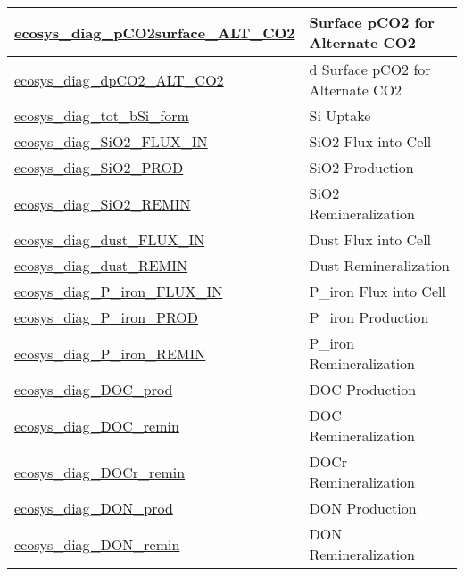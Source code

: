 {\begin{center}
\begin{longtable}{| p{2.0in} | p{4.0in} |}
    \hline
    \hyperref[subsec:var_sec_forcing_ecosys_diag_pCO2surface_ALT_CO2]{ecosys\_diag\_pCO2surface\_\-ALT\_CO2} & Surface pCO2 for Alternate CO2 \\
    \hline
    \hyperref[subsec:var_sec_forcing_ecosys_diag_dpCO2_ALT_CO2]{ecosys\_diag\_dpCO2\_ALT\_CO2} & d Surface pCO2 for Alternate CO2 \\
    \hline
    \hyperref[subsec:var_sec_forcing_ecosys_diag_tot_bSi_form]{ecosys\_diag\_tot\_bSi\_form} & Si Uptake \\
    \hline
    \hyperref[subsec:var_sec_forcing_ecosys_diag_SiO2_FLUX_IN]{ecosys\_diag\_SiO2\_FLUX\_IN} & SiO2 Flux into Cell \\
    \hline
    \hyperref[subsec:var_sec_forcing_ecosys_diag_SiO2_PROD]{ecosys\_diag\_SiO2\_PROD} & SiO2 Production \\
    \hline
    \hyperref[subsec:var_sec_forcing_ecosys_diag_SiO2_REMIN]{ecosys\_diag\_SiO2\_REMIN} & SiO2 Remineralization \\
    \hline
    \hyperref[subsec:var_sec_forcing_ecosys_diag_dust_FLUX_IN]{ecosys\_diag\_dust\_FLUX\_IN} & Dust Flux into Cell \\
    \hline
    \hyperref[subsec:var_sec_forcing_ecosys_diag_dust_REMIN]{ecosys\_diag\_dust\_REMIN} & Dust Remineralization \\
    \hline
    \hyperref[subsec:var_sec_forcing_ecosys_diag_P_iron_FLUX_IN]{ecosys\_diag\_P\_iron\_FLUX\_\-IN} & P\_iron Flux into Cell \\
    \hline
    \hyperref[subsec:var_sec_forcing_ecosys_diag_P_iron_PROD]{ecosys\_diag\_P\_iron\_PROD} & P\_iron Production \\
    \hline
    \hyperref[subsec:var_sec_forcing_ecosys_diag_P_iron_REMIN]{ecosys\_diag\_P\_iron\_REMIN} & P\_iron Remineralization \\
    \hline
    \hyperref[subsec:var_sec_forcing_ecosys_diag_DOC_prod]{ecosys\_diag\_DOC\_prod} & DOC Production \\
    \hline
    \hyperref[subsec:var_sec_forcing_ecosys_diag_DOC_remin]{ecosys\_diag\_DOC\_remin} & DOC Remineralization \\
    \hline
    \hyperref[subsec:var_sec_forcing_ecosys_diag_DOCr_remin]{ecosys\_diag\_DOCr\_remin} & DOCr Remineralization \\
    \hline
    \hyperref[subsec:var_sec_forcing_ecosys_diag_DON_prod]{ecosys\_diag\_DON\_prod} & DON Production \\
    \hline
    \hyperref[subsec:var_sec_forcing_ecosys_diag_DON_remin]{ecosys\_diag\_DON\_remin} & DON Remineralization \\

\end{longtable}
\end{center}}
